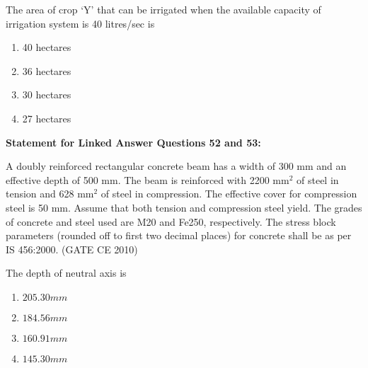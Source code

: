     
    \item The area of crop `Y' that can be irrigated when the available capacity of irrigation system is 40 litres/sec is

    \begin{multicols}{4}
        \begin{enumerate}
            \item 40 hectares
            \item 36 hectares
            \item 30 hectares
            \item 27 hectares
        \end{enumerate}
    \end{multicols}


    \textbf{Statement for Linked Answer Questions 52 and 53:}

    A doubly reinforced rectangular concrete beam has a width of 300 mm and an effective depth of 500 mm. The beam is reinforced with 2200 mm$^2$ of steel in tension and 628 mm$^2$ of steel in compression. The effective cover for compression steel is 50 mm. Assume that both tension and compression steel yield. The grades of concrete and steel used are M20 and Fe250, respectively. The stress block parameters (rounded off to first two decimal places) for concrete shall be as per IS 456:2000.  \hfill (GATE CE 2010) \\ 

    \item The depth of neutral axis is
    \begin{multicols}{4}
        \begin{enumerate}
            \item $205.30 mm$
            \item $184.56 mm$
            \item $160.91 mm$
            \item $145.30 mm$
        \end{enumerate}
    \end{multicols}
